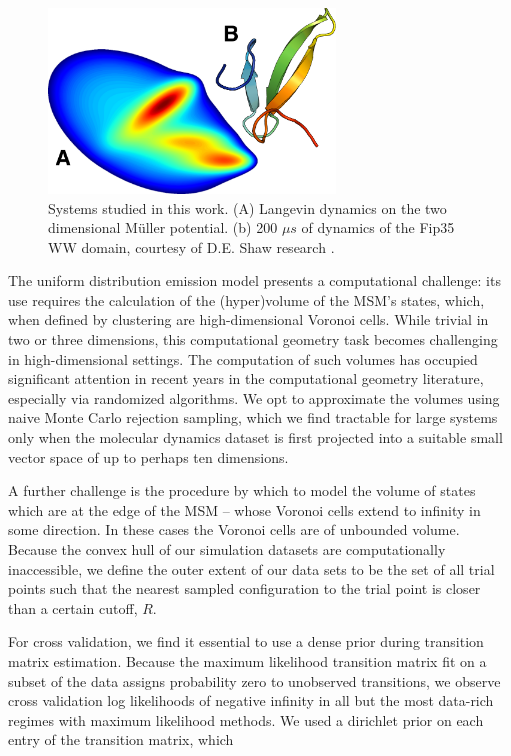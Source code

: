 \documentclass[twocolumn,floatfix,nofootinbib,aps]{revtex4-1}
\begin{document}
\begin{figure}
\centering
\includegraphics[width=3in]{figs_final/mull_ww.png}
\caption{Systems studied in this work. (A) Langevin dynamics on the two dimensional M\"{u}ller potential. (b) 200 $\mu s$ of dynamics of the Fip35 WW domain\cite{Liu2008Experimental}, courtesy of D.E. Shaw research \cite{Shaw2010Atomic}.}
\end{figure}

The uniform distribution emission model presents a computational challenge: its use requires the calculation of the (hyper)volume of the MSM's states, which, when defined by clustering are high-dimensional Voronoi cells. While trivial in two or three dimensions, this computational geometry task becomes challenging in high-dimensional settings. The computation of such volumes has occupied significant attention in recent years in the computational geometry literature, especially via randomized algorithms\cite{Kannan97, Simonovits03, Lovasz03}. We opt to approximate the volumes using naive Monte Carlo rejection sampling, which we find tractable for large systems only when the molecular dynamics dataset is first projected into a suitable small vector space of up to perhaps ten dimensions.

A further challenge is the procedure by which to model the volume of states which are at the edge of the MSM -- whose Voronoi cells extend to infinity in some direction. In these cases the Voronoi cells are of unbounded volume. Because the convex hull of our simulation datasets are computationally inaccessible, we define the outer extent of our data sets to be the set of all trial points such that the nearest sampled configuration to the trial point is closer than a certain cutoff, $R$.

For cross validation, we find it essential to use a dense prior during transition matrix estimation. Because the maximum likelihood transition matrix fit on a subset of the data assigns probability zero to unobserved transitions, we observe cross validation log likelihoods of negative infinity in all but the most data-rich regimes with maximum likelihood methods. We used a dirichlet prior on each entry of the transition matrix, which 
\end{document}
